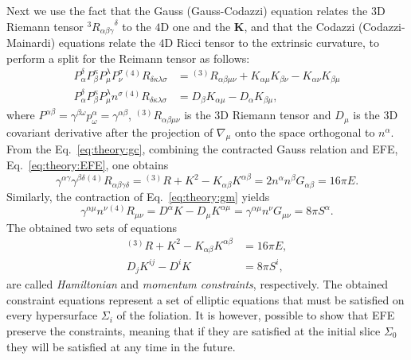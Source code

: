 Next we use the fact that the Gauss (Gauss-Codazzi) equation relates the $3$D Riemann tensor
$^3{R_{\alpha\beta\gamma}}^{\delta}$ to the $4$D one and the $\boldsymbol{K}$, and that the 
Codazzi (Codazzi-Mainardi) equations relate the $4$D Ricci tensor to the extrinsic curvature,
to perform a split for the Reimann tensor as follows:
%
\begin{subequations}
    \begin{align}
        P_{\alpha}^{\delta}P_{\beta}^{\kappa}P_{\mu}^{\lambda}P_{\nu}^{\sigma} {^{(4)}R}_{\delta\kappa\lambda\sigma} 
        &= {^{(3)}R}_{\alpha\beta\mu\nu} + K_{\alpha\mu}K_{\beta\nu} - K_{\alpha\nu}K_{\beta\mu} \label{eq:theory:gc}\\
        P_{\alpha}^{\delta}P_{\beta}^{\kappa}P_{\mu}^{\lambda}n^{\sigma} {^{(4)}R}_{\delta\kappa\lambda\sigma} 
        &= D_{\beta}K_{\alpha\mu} - D_{\alpha}K_{\beta\mu}, \label{eq:theory:gm}
    \end{align}
\end{subequations}
%
where $P^{\alpha\beta} = \gamma^{\beta\omega}p_{\omega}^{\alpha} = \gamma^{\alpha\beta}$, 
$^{(3)}R_{\alpha\beta\mu\nu}$ is the 3D Riemann tensor and $D_{\mu}$ is the 3D covariant derivative after 
the projection of $\nabla_{\mu}$ onto the space orthogonal to $n^{\alpha}$.
%
From the Eq.~\eqref{eq:theory:gc}, combining the contracted Gauss relation and \ac{EFE}, Eq.~\eqref{eq:theory:EFE}, one obtains 
%
\begin{equation}
    \gamma^{\alpha\gamma}\gamma^{\beta\delta} {^{(4)}R}_{\alpha\beta\gamma\delta} = {^{(3)}R} + K^2 - K_{\alpha\beta}K^{\alpha\beta} = 2n^{\alpha}n^{\beta}G_{\alpha\beta} = 16\pi E.
\end{equation}
%
Similarly, the contraction of Eq.~\eqref{eq:theory:gm} yields
%
\begin{equation}
    \gamma^{\alpha\mu}n^{\nu}{^{(4)}R_{\mu\nu}} = D^{\alpha}K - D_{\mu}K^{\alpha\mu} = \gamma^{\alpha\mu}n^{\nu}G_{\mu\nu} = 8\pi S^{\alpha}.
\end{equation}
%
The obtained two sets of equations 
%
\begin{align}
    {^{(3)}R} + K^2 - K_{\alpha\beta} K^{\alpha\beta} &= 16\pi E, \label{eq:theory:ham_const}\\
    D_j K^{ij} - D^i K &= 8\pi S^i, \label{eq:theory:mom_const}
\end{align}
%
are called \textit{Hamiltonian} and \textit{momentum constraints}, respectively.
%
The obtained constraint equations represent a set of elliptic equations 
that must be satisfied on every hypersurface $\Sigma_i$ of the foliation. 
%
It is however, possible to show that \ac{EFE} preserve the constraints, 
meaning that if they are satisfied at the initial slice $\Sigma_0$ 
they will be satisfied at any time in the future.

